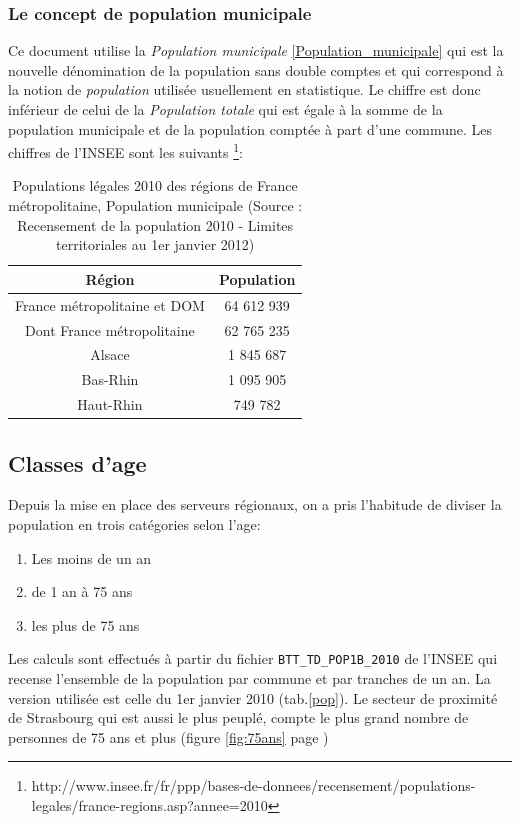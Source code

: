 \documentclass[12pt,english,french,twoside]{report}\usepackage[]{graphicx}\usepackage[]{color}
\providecommand{\tabularnewline}{\\} %
\begin{document}
\subsubsection{Le concept de population municipale}

Ce document utilise la \emph{Population municipale} \ref{Population_municipale}   qui est la nouvelle dénomination de la population sans double comptes et qui correspond à la notion de \emph{population} utilisée usuellement en statistique.
Le chiffre est donc inférieur de celui de la \emph{Population totale} qui est égale à la somme de la population municipale et de la population comptée à part d'une commune.
Les chiffres de l'INSEE sont les suivants \footnote{http://www.insee.fr/fr/ppp/bases-de-donnees/recensement/populations-legales/france-regions.asp?annee=2010}:

\begin{table}
\begin{center}
\begin{tabular}{|c|c|}
\hline 
Région & Population\tabularnewline
\hline 
\hline 
France métropolitaine et DOM & 64 612 939\tabularnewline
\hline 
Dont France métropolitaine & 62 765 235\tabularnewline
\hline 
Alsace & 1 845 687\tabularnewline
\hline 
Bas-Rhin & 1 095 905\tabularnewline
\hline 
Haut-Rhin & 749 782\tabularnewline
\hline 
\end{tabular}
\caption[Populations légales 2010]{Populations légales 2010 des régions de France métropolitaine, Population
municipale (Source : Recensement de la population 2010 - Limites territoriales
au 1er janvier 2012) }
\label{pop2010}
\end{center}
\end{table}

\subsection{Classes d'age}
Depuis la mise en place des serveurs régionaux, on a pris l'habitude de diviser la population en trois catégories selon l'age:
\begin{enumerate}
  \item Les moins de un an
  \item de 1 an à 75 ans
  \item les plus de 75 ans
\end{enumerate}

Les calculs sont effectués à partir du fichier \texttt{BTT\_TD\_POP1B\_2010} de l'INSEE qui recense l'ensemble de la population par commune et par tranches de un an. La version utilisée est celle du 1er janvier 2010 (tab.\ref{pop}). Le secteur de proximité de Strasbourg qui est aussi le plus peuplé, compte le plus grand nombre de personnes de 75 ans et plus (figure \ref{fig:75ans} page \pageref{fig:75ans})
\end{document}
